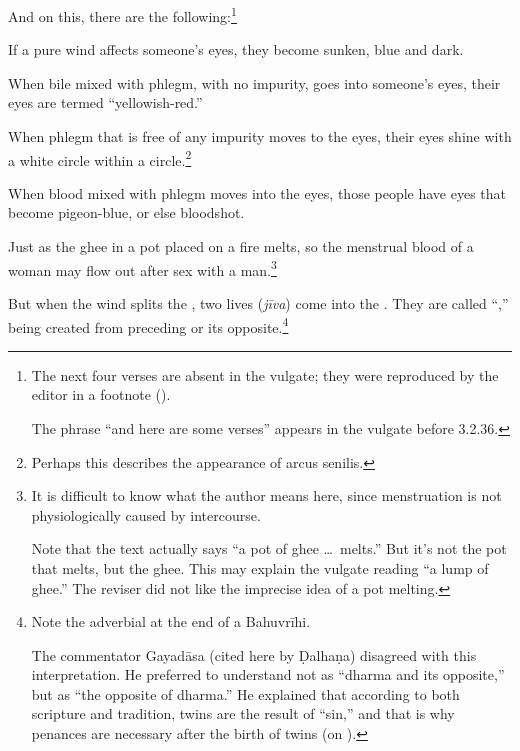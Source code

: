 \begin{translation}


\item[35.1--4]

And on this, there are the following:\footnote{The next four verses are 
absent in the vulgate; they were reproduced by the 
editor in a footnote (\cite[348a, n.\,3]{vulgate}).

The phrase “and here are some verses” appears 
in the vulgate before 3.2.36.}

\begin{sloka}
If a pure wind affects someone's eyes, they become
sunken, blue and dark.

    
When bile mixed with phlegm, with no impurity, goes into
someone's eyes, their eyes are termed “yellowish-red.”
    
When phlegm that is free of any impurity moves to the eyes, their
eyes shine with a white circle within a circle.\footnote{Perhaps this
    describes the appearance of arcus senilis.}
    
When blood mixed with phlegm moves into the eyes, those people
have eyes that become pigeon-blue, or else bloodshot.
  
    \end{sloka}

\item [3.2.36]

Just as the ghee in a pot placed on a fire melts, so the menstrual
blood of a woman may flow out after sex with a man.\footnote{It is
    difficult to know what the author means here, since menstruation is
    not physiologically caused by intercourse.
    
Note that the text actually says “a pot of ghee \ldots\ melts.”  But it's
not the pot that melts, but the ghee.  This may explain the vulgate
reading  “a lump of ghee.”  The reviser did not like
the imprecise idea of a pot melting.}

\item [3.2.37]

But when the wind splits the , two lives 
(\emph{jīva}) come into the .
They are called “,” being created from preceding
 or its opposite.\footnote{Note the adverbial 
 at the end of a Bahuvrīhi.  

The commentator Gayadāsa (cited here by Ḍalhaṇa) disagreed with this
interpretation.  He preferred to understand  not as
“dharma and its opposite,” but as “the opposite of dharma.” He
explained that according to both scripture and tradition, twins are
the result of  “sin,” and that is why penances are
necessary after the birth of twins (on ).

}
\end{translation}
